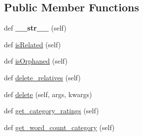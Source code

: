 \subsection*{Public Member Functions}
\begin{DoxyCompactItemize}
\item 
\mbox{\label{classcapstoneproject_1_1models_1_1models_1_1content__rating_1_1_content_rating_a52aa37bea815a2e4c6f3feb59a09f253}} 
def {\bfseries \+\_\+\+\_\+str\+\_\+\+\_\+} (self)
\item 
def \mbox{\hyperlink{classcapstoneproject_1_1models_1_1models_1_1content__rating_1_1_content_rating_a1a4c74dc2d2b659db1f127819ff0e37c}{is\+Related}} (self)
\item 
def \mbox{\hyperlink{classcapstoneproject_1_1models_1_1models_1_1content__rating_1_1_content_rating_a90cb62281932167c282b0494195c5a7f}{is\+Orphaned}} (self)
\item 
def \mbox{\hyperlink{classcapstoneproject_1_1models_1_1models_1_1content__rating_1_1_content_rating_ad2677eea30196cd809803f2dffc40767}{delete\+\_\+relatives}} (self)
\item 
def \mbox{\hyperlink{classcapstoneproject_1_1models_1_1models_1_1content__rating_1_1_content_rating_a51bddb1978f6388fdfd71ed6befda9bd}{delete}} (self, args, kwargs)
\item 
def \mbox{\hyperlink{classcapstoneproject_1_1models_1_1models_1_1content__rating_1_1_content_rating_a7dbc3b35b8a4a6489ae0fd9b31819794}{get\+\_\+category\+\_\+ratings}} (self)
\item 
def \mbox{\hyperlink{classcapstoneproject_1_1models_1_1models_1_1content__rating_1_1_content_rating_aa7de27c1a4d3133161bbfab07eba8e85}{get\+\_\+word\+\_\+count\+\_\+category}} (self)
\end{DoxyCompactItemize}
